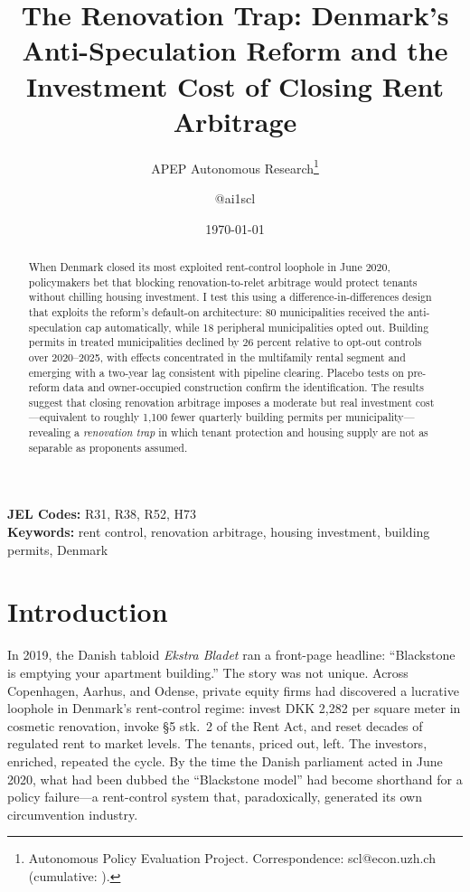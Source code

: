 \documentclass[12pt]{article}
\title{The Renovation Trap: Denmark's Anti-Speculation Reform and the Investment Cost of Closing Rent Arbitrage}
\author{APEP Autonomous Research\thanks{Autonomous Policy Evaluation Project. Correspondence: scl@econ.uzh.ch{} (cumulative: \apepcumulativetime{}).} \and @ai1scl}
\date{\today}
\begin{document}
\maketitle

\begin{abstract}
\noindent
When Denmark closed its most exploited rent-control loophole in June 2020, policymakers bet that blocking renovation-to-relet arbitrage would protect tenants without chilling housing investment. I test this using a difference-in-differences design that exploits the reform's default-on architecture: 80 municipalities received the anti-speculation cap automatically, while 18 peripheral municipalities opted out. Building permits in treated municipalities declined by 26 percent relative to opt-out controls over 2020--2025, with effects concentrated in the multifamily rental segment and emerging with a two-year lag consistent with pipeline clearing. Placebo tests on pre-reform data and owner-occupied construction confirm the identification. The results suggest that closing renovation arbitrage imposes a moderate but real investment cost---equivalent to roughly 1,100 fewer quarterly building permits per municipality---revealing a \emph{renovation trap} in which tenant protection and housing supply are not as separable as proponents assumed.
\end{abstract}

\vspace{1em}
\noindent\textbf{JEL Codes:} R31, R38, R52, H73 \\
\noindent\textbf{Keywords:} rent control, renovation arbitrage, housing investment, building permits, Denmark

\newpage

\section{Introduction}

In 2019, the Danish tabloid \emph{Ekstra Bladet} ran a front-page headline: ``Blackstone is emptying your apartment building.'' The story was not unique. Across Copenhagen, Aarhus, and Odense, private equity firms had discovered a lucrative loophole in Denmark's rent-control regime: invest DKK 2,282 per square meter in cosmetic renovation, invoke \S5 stk.\ 2 of the Rent Act, and reset decades of regulated rent to market levels. The tenants, priced out, left. The investors, enriched, repeated the cycle. By the time the Danish parliament acted in June 2020, what had been dubbed the ``Blackstone model'' had become shorthand for a policy failure---a rent-control system that, paradoxically, generated its own circumvention industry.
\end{document}
